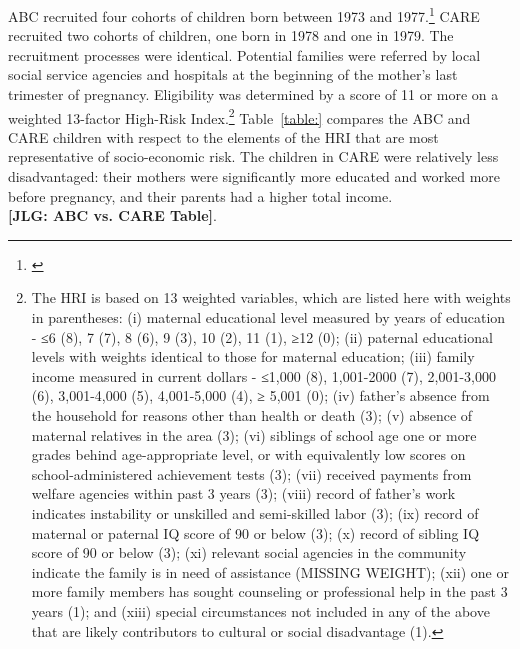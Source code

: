 \noindent ABC recruited four cohorts of children born between 1973 and 1977.\footnote{\citet{Feagans_1996_Childrens-Talk}} CARE recruited two cohorts of children, one  born in 1978 and one in 1979. The recruitment processes were identical. Potential families were referred by local social service agencies and hospitals at the beginning of the mother's last trimester of pregnancy. Eligibility was determined by a score of 11 or more on a weighted 13-factor High-Risk Index.\footnote{The HRI is based on 13 weighted variables, which are listed here with weights in parentheses: (i) maternal educational level measured by years of education - ≤6 (8), 7 (7), 8 (6), 9 (3), 10 (2), 11 (1), ≥12 (0); (ii) paternal educational levels with weights identical to those for maternal education; (iii) family income measured in current dollars - ≤1,000 (8), 1,001-2000 (7), 2,001-3,000 (6), 3,001-4,000 (5), 4,001-5,000 (4), ≥ 5,001 (0); (iv) father’s absence from the household for reasons other than health or death (3); (v) absence of maternal relatives in the area (3); (vi) siblings of school age one or more grades behind age-appropriate level, or with equivalently low scores on school-administered achievement tests (3); (vii) received payments from welfare agencies within past 3 years (3); (viii) record of father’s work indicates instability or unskilled and semi-skilled labor (3); (ix) record of maternal or paternal IQ score of 90 or below (3); (x) record of sibling IQ score of 90 or below (3); (xi) relevant social agencies in the community indicate the family is in need of assistance (MISSING WEIGHT); (xii) one or more family members has sought counseling or professional help in the past 3 years (1); and (xiii) special circumstances not included in any of the above that are likely contributors to cultural or social disadvantage (1).} Table~\ref{table:} compares the ABC and CARE children with respect to the elements of the HRI that are most representative of socio-economic risk. The children in CARE were relatively less disadvantaged: their mothers were significantly more educated and worked more before pregnancy, and their parents had a higher total income.\\

\noindent \textbf{[JLG: ABC vs. CARE Table]}.\\

